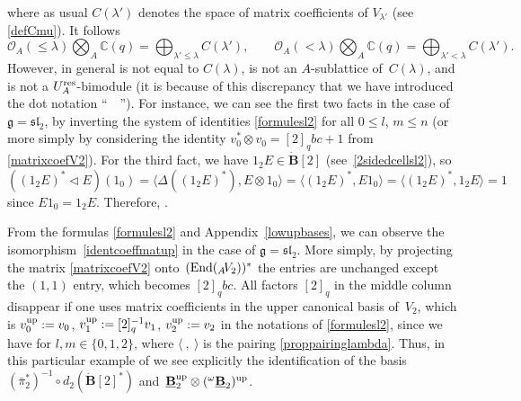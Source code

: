 \documentclass[10pt,a4paper]{amsart}
\numberwithin{equation}{section}
\theoremstyle{definition}
\newcommand{\Oo}{{\mathcal O}}
\newcommand{\smallbullet}{%
\vcenter{\hbox{\,\scalebox{0.5}{$\bullet$}\,}}
}
\begin{document}
where as usual $C(\lambda')$ denotes the space of matrix coefficients of $V_{\lambda'}$ (see \eqref{defCmu}). It follows
\begin{equation}\label{tensorCOA}
\Oo_A(\leq \lambda) \bigotimes_A {\mathbb C}(q)=\bigoplus_{\lambda'\leq \lambda}C(\lambda'), \qquad\Oo_A(<\lambda) \bigotimes_A {\mathbb C}(q)=\bigoplus_{\lambda'< \lambda}C(\lambda').
\end{equation}
However, in general \smash{${}_A \overset{\raisebox{-1.5pt}{\scriptsize$\smallbullet$}}{C} (\lambda)\bigotimes_A {\mathbb C}(q)$} is not equal to $C(\lambda)$, \smash{${}_A \overset{\raisebox{-1.5pt}{\scriptsize$\smallbullet$}}{C} (\lambda)$} is not an $A$-sublattice of~$C(\lambda)$, and \smash{${}_A \overset{\raisebox{-1.5pt}{\scriptsize$\smallbullet$}}{C} (\lambda)$} is not a $U_A^{\rm res}$-bimodule (it is because of this discrepancy that we have introduced the dot notation ``\ \smash{${}^{\smallbullet}$}\ ''). For instance, we can see the first two facts in the case of $\mathfrak{g} = {\mathfrak{sl}_2}$, by inverting the system of identities \eqref{formulesl2} for all $0\leq l$, $m\leq n$ (or more simply by considering the identity $v_0^* \otimes v_0=[2]_qbc +1$ from \eqref{matrixcoefV2}). For the third fact, we have ${1_2 E\in \dot{\mathbf{B}} [2]}$ (see~\eqref{2sidedcellsl2}), so~${((1_2 E)^* \lhd E)(1_0) \!=\!\langle \Delta((1_2 E)^* ), E\otimes 1_0\rangle\!= \! \langle(1_2 E)^* , E1_0\rangle\!=\!\langle(1_2 E)^*, 1_2E\rangle\!=\!1}$ since $E1_0\! =\! 1_2E$. Therefore, \smash{$(1_2 E)^* \lhd E \notin {}_A \overset{\raisebox{-1.5pt}{\scriptsize$\smallbullet$}}{C} (2)$}.

From the formulas \eqref{formulesl2} and Appendix~\ref{lowupbases}, we can observe the isomorphism~\eqref{identcoeffmatup} in the case of $\mathfrak{g} = {\mathfrak{sl}_2}$. More simply, by projecting the matrix \eqref{matrixcoefV2} onto~$({\rm End}({}_A \!V_2))^*$ the entries are unchanged except the $(1,1)$ entry, which becomes $[2]_q bc$. All factors $[2]_q$ in the middle column disappear if one uses matrix coefficients in the upper canonical basis of~$V_2$, which is $v_0^{\rm up}:=v_0$, $v_1^{\rm up}:=[2]_q^{-1}v_1$, $v_2^{\rm up}:=v_2$ in the notations of \eqref{formulesl2}, since we have
 for $l,m\in \{0,1,2\}$, where $\langle\ ,\ \rangle$ is the pairing \eqref{proppairinglambda}. Thus, in this particular example of  we see explicitly the identification of the basis $(\bar{\pi}_2^*)^{-1} \circ d_2(\dot{\mathbf{B}} [2]^*)$ and~${\underline{\mathbf{B}}_2^{\rm up} \otimes ({}^{\omega}\underline{\mathbf{B}}_2)^{\rm up}}$.
\end{document}
